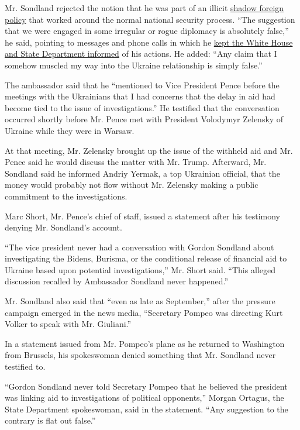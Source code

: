 Mr. Sondland rejected the notion that he was part of an illicit
\href{https://www.nytimes.com/interactive/2019/11/18/us/politics/trump-ukraine-impeachment-testimony.html}{shadow
foreign policy} that worked around the normal national security process.
``The suggestion that we were engaged in some irregular or rogue
diplomacy is absolutely false,'' he said, pointing to messages and phone
calls in which he
\href{https://www.nytimes.com/2019/11/20/us/politics/sondland-pompeo-ukraine.html}{kept
the White House and State Department informed} of his actions. He added:
``Any claim that I somehow muscled my way into the Ukraine relationship
is simply false.''

The ambassador said that he ``mentioned to Vice President Pence before
the meetings with the Ukrainians that I had concerns that the delay in
aid had become tied to the issue of investigations.'' He testified that
the conversation occurred shortly before Mr. Pence met with President
Volodymyr Zelensky of Ukraine while they were in Warsaw.

At that meeting, Mr. Zelensky brought up the issue of the withheld aid
and Mr. Pence said he would discuss the matter with Mr. Trump.
Afterward, Mr. Sondland said he informed Andriy Yermak, a top Ukrainian
official, that the money would probably not flow without Mr. Zelensky
making a public commitment to the investigations.

Marc Short, Mr. Pence's chief of staff, issued a statement after his
testimony denying Mr. Sondland's account.

``The vice president never had a conversation with Gordon Sondland about
investigating the Bidens, Burisma, or the conditional release of
financial aid to Ukraine based upon potential investigations,'' Mr.
Short said. ``This alleged discussion recalled by Ambassador Sondland
never happened.''

Mr. Sondland also said that ``even as late as September,'' after the
pressure campaign emerged in the news media, ``Secretary Pompeo was
directing Kurt Volker to speak with Mr. Giuliani.''

In a statement issued from Mr. Pompeo's plane as he returned to
Washington from Brussels, his spokeswoman denied something that Mr.
Sondland never testified to.

``Gordon Sondland never told Secretary Pompeo that he believed the
president was linking aid to investigations of political opponents,''
Morgan Ortagus, the State Department spokeswoman, said in the statement.
``Any suggestion to the contrary is flat out false.''

